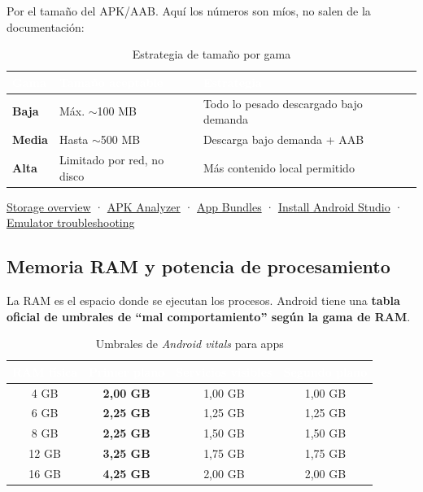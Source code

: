  Por el tamaño del APK/AAB. Aquí los números son míos, no salen de la documentación:

\begin{table}[htbp]
\centering
\small
\begin{tabularx}{\textwidth}{@{}l l >{\RaggedRight\arraybackslash}X@{}}
\toprule
\rowcolor{primary}
\textcolor{white}{\sffamily\bfseries Gama} & \textcolor{white}{\sffamily\bfseries Tamaño aceptable} & \textcolor{white}{\sffamily\bfseries Estrategia} \\
\midrule
\textbf{Baja} & Máx. $\sim$100 MB & Todo lo pesado descargado bajo demanda \\
\rowcolor{soft}
\textbf{Media} & Hasta $\sim$500 MB & Descarga bajo demanda + AAB \\
\textbf{Alta} & Limitado por red, no disco & Más contenido local permitido \\
\bottomrule
\end{tabularx}
\caption{Estrategia de tamaño por gama}
\end{table}

\begin{fuentesbox}
\href{https://developer.android.com/training/data-storage}{Storage overview} ·
\href{https://developer.android.com/studio/debug/apk-analyzer}{APK Analyzer} ·
\href{https://developer.android.com/guide/app-bundle/dynamic-delivery}{App Bundles} ·
\href{https://developer.android.com/studio/install}{Install Android Studio} ·
\href{https://developer.android.com/studio/run/emulator-troubleshooting}{Emulator troubleshooting}
\end{fuentesbox}

\subsection{Memoria RAM y potencia de procesamiento}

La RAM es el espacio donde se ejecutan los procesos. Android tiene una \textbf{tabla oficial de umbrales de \enquote{mal comportamiento} según la gama de RAM}.

\begin{table}[htbp]
\centering
\small
\begin{tabular}{@{}c c c c@{}}
\toprule
\rowcolor{primary}
\textcolor{white}{\sffamily\bfseries RAM física} & \textcolor{white}{\sffamily\bfseries Primer plano} & \textcolor{white}{\sffamily\bfseries Servicios visibles} & \textcolor{white}{\sffamily\bfseries Segundo plano} \\
\midrule
4 GB & \textbf{2,00 GB} & 1,00 GB & 1,00 GB \\
\rowcolor{soft}
6 GB & \textbf{2,25 GB} & 1,25 GB & 1,25 GB \\
8 GB & \textbf{2,25 GB} & 1,50 GB & 1,50 GB \\
\rowcolor{soft}
12 GB & \textbf{3,25 GB} & 1,75 GB & 1,75 GB \\
16 GB & \textbf{4,25 GB} & 2,00 GB & 2,00 GB \\
\bottomrule
\end{tabular}
\caption{Umbrales de \emph{Android vitals} para apps}
\end{table}

